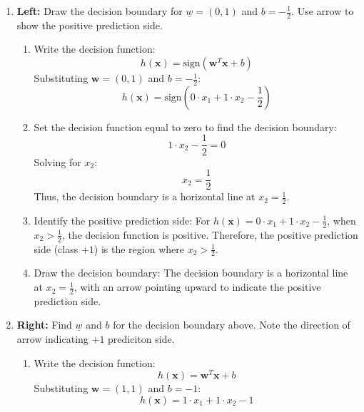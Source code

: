     \begin{example}
        \begin{enumerate}
            \item \textbf{Left:} Draw the decision boundary for $\underline{w} = (0,1)$ and $b = -\frac{1}{2}$. Use arrow to show the positive prediction side.
            \begin{enumerate}
    
                \item Write the decision function:
                \[
                h(\mathbf{x}) = \text{sign}(\mathbf{w}^T \mathbf{x} + b)
                \]
                Substituting \( \mathbf{w} = (0,1) \) and \( b = -\frac{1}{2} \):
                \[
                h(\mathbf{x}) = \text{sign}(0 \cdot x_1 + 1 \cdot x_2 - \frac{1}{2})
                \]
        
                \item Set the decision function equal to zero to find the decision boundary:
                \[
                1 \cdot x_2 - \frac{1}{2} = 0
                \]
                Solving for \( x_2 \):
                \[
                x_2 = \frac{1}{2}
                \]
                Thus, the decision boundary is a horizontal line at \( x_2 = \frac{1}{2} \).
        
                \item Identify the positive prediction side:
                For \(h(\mathbf{x}) = 0 \cdot x_1 + 1 \cdot x_2 - \frac{1}{2} \), when \( x_2 > \frac{1}{2} \), the decision function is positive. Therefore, the positive prediction side (class \( +1 \)) is the region where \( x_2 > \frac{1}{2} \).
        
                \item Draw the decision boundary:
                The decision boundary is a horizontal line at \( x_2 = \frac{1}{2} \), with an arrow pointing upward to indicate the positive prediction side.
            
            \end{enumerate}
            \item \textbf{Right:} Find $\underline{w}$ and $b$ for the decision boundary above. Note the direction of arrow indicating $+1$ prediciton side.
            \begin{enumerate}
    
                \item Write the decision function:
                \[
                h(\mathbf{x}) = \mathbf{w}^T \mathbf{x} + b
                \]
                Substituting \( \mathbf{w} = (1,1) \) and \( b = -1 \):
                \[
                h(\mathbf{x}) = 1 \cdot x_1 + 1 \cdot x_2 - 1
                \]
        

\end{enumerate}
\end{enumerate}
\end{example}

